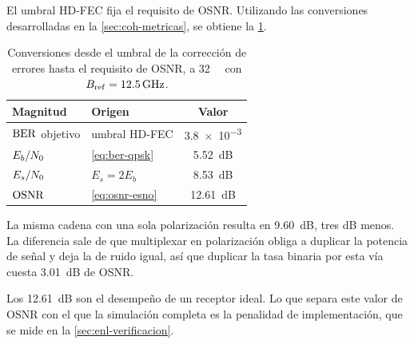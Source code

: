 El umbral HD-FEC fija el requisito de OSNR. Utilizando las
conversiones desarrolladas en la \cref{sec:coh-metricas}, se obtiene la
\cref{tab:cadena-teorica}.

\begin{table}[htbp]
  \centering

  \begin{tabular}{llc}
    \toprule
    Magnitud & Origen & Valor \\
    \midrule
    $\mathrm{BER}$ objetivo & umbral HD-FEC       & \num{3.8e-3} \\
    $E_{b}/N_{0}$         & \cref{eq:ber-qpsk}  & \SI{5.52}{\dB} \\
    $E_{s}/N_{0}$         & $E_s = 2E_b$        & \SI{8.53}{\dB} \\
    $\mathrm{OSNR}$         & \cref{eq:osnr-esno} & \SI{12.61}{\dB} \\
    \bottomrule
  \end{tabular}
  \caption[Del umbral HD-FEC al requisito de OSNR]{%
    Conversiones desde el umbral de la correcci\'on de errores hasta
    el requisito de OSNR, a \SI{32}{\giga\baud} con
    $B_{\mathrm{ref}} = \SI{12.5}{\giga\hertz}$.}
  \label{tab:cadena-teorica}
\end{table}

La misma cadena con una sola polarizaci\'on resulta en \SI{9.60}{\dB}, tres dB menos.
La diferencia sale de que multiplexar en polarizaci\'on obliga a duplicar la
potencia de se\~nal y deja la de ruido igual, as\'i que duplicar la tasa
binaria por esta v\'ia cuesta \SI{3.01}{\dB} de OSNR.

Los \SI{12.61}{\dB} son el desempe\~no de un receptor ideal. Lo que separa este
valor de OSNR con el que la simulaci\'on completa es
la penalidad de implementaci\'on, que se mide en la
\cref{sec:enl-verificacion}.
